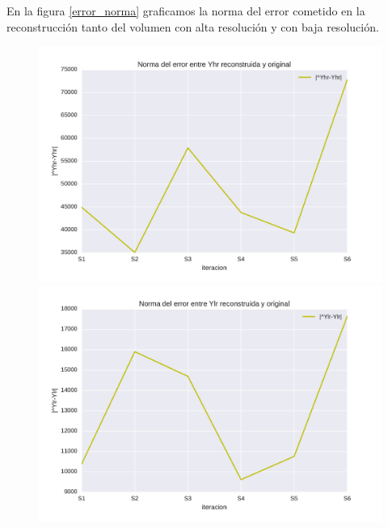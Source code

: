 \documentclass[a4paper,10pt]{article}%
\begin{document}
En la figura \ref{error_norma} graficamos la norma del error cometido en la reconstrucción tanto del volumen con 
alta resolución y con baja resolución.


\begin{figure}[H]
\includegraphics[scale=0.4]{norma_error_yhr.pdf}
\includegraphics[scale=0.4]{norma_error_lr.pdf}


\end{figure}
\end{document}
